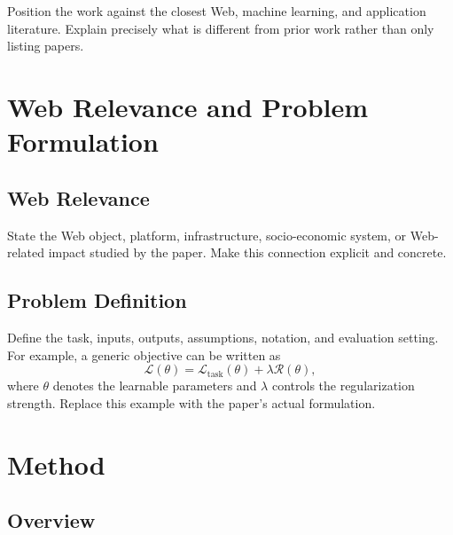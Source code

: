 \documentclass[sigconf,anonymous,review]{acmart}
\begin{document}
Position the work against the closest Web, machine learning, and application
literature. Explain precisely what is different from prior work rather than
only listing papers.

\section{Web Relevance and Problem Formulation}
\label{sec:problem}

\subsection{Web Relevance}
\label{sec:web-relevance}

State the Web object, platform, infrastructure, socio-economic system, or
Web-related impact studied by the paper. Make this connection explicit and
concrete.

\subsection{Problem Definition}
\label{sec:problem-definition}

Define the task, inputs, outputs, assumptions, notation, and evaluation
setting. For example, a generic objective can be written as
\begin{equation}
  \mathcal{L}(\theta)
  =
  \mathcal{L}_{\mathrm{task}}(\theta)
  + \lambda \mathcal{R}(\theta),
  \label{eq:objective}
\end{equation}
where $\theta$ denotes the learnable parameters and $\lambda$ controls the
regularization strength. Replace this example with the paper's actual
formulation.

\section{Method}
\label{sec:method}

\subsection{Overview}
\label{sec:method-overview}
\end{document}
